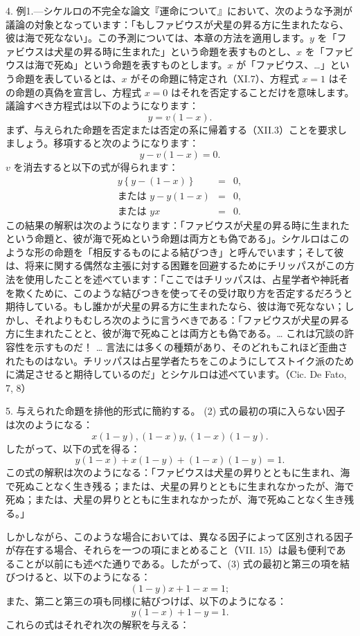 \documentclass[a4paper,11pt,openany]{ltjsbook}
\begin{document}
4. 例1.—シケルロの不完全な論文『運命について』において、次のような予測が議論の対象となっています：「もしファビウスが犬星の昇る方に生まれたなら、彼は海で死なない」。この予測については、本章の方法を適用します。$y$ を「ファビウスは犬星の昇る時に生まれた」という命題を表すものとし、$x$ を「ファビウスは海で死ぬ」という命題を表すものとします。$x$ が「ファビウス、…」という命題を表しているとは、$x$ がその命題に特定され（XI.7）、方程式 $x = 1$ はその命題の真偽を宣言し、方程式 $x = 0$ はそれを否定することだけを意味します。議論すべき方程式は以下のようになります：
\[
y = v(1-x).
\]
まず、与えられた命題を否定または否定の系に帰着する（XII.3）ことを要求しましょう。移項すると次のようになります：
\[
y - v(1-x) = 0.
\]
$v$ を消去すると以下の式が得られます：
\begin{eqnarray}
y \left\{ y - (1-x) \right\} &=& 0, \nonumber \\
\textrm{または } y - y(1-x) &=& 0, \nonumber \\
\textrm{または } yx &=& 0.
\end{eqnarray}
この結果の解釈は次のようになります：「ファビウスが犬星の昇る時に生まれたという命題と、彼が海で死ぬという命題は両方とも偽である」。シケルロはこのような形の命題を「相反するものによる結びつき」と呼んでいます；そして彼は、将来に関する偶然な主張に対する困難を回避するためにチリッパスがこの方法を使用したことを述べています：「ここではチリッパスは、占星学者や神託者を欺くために、このような結びつきを使ってその受け取り方を否定するだろうと期待している。もし誰かが犬星の昇る方に生まれたなら、彼は海で死なない；しかし、それよりもむしろ次のように言うべきである：「ファビウスが犬星の昇る方に生まれたことと、彼が海で死ぬことは両方とも偽である。… これは冗談の許容性を示すものだ！ … 言法には多くの種類があり、そのどれもこれほど歪曲されたものはない。チリッパスは占星学者たちをこのようにしてストイク派のために満足させると期待しているのだ」とシケルロは述べています。（Cic. De Fato, 7, 8）

5. 与えられた命題を排他的形式に簡約する。
(2) 式の最初の項に入らない因子は次のようになる：
\[
x(1-y), (1-x)y, (1-x)(1-y).
\]
したがって、以下の式を得る：
\begin{equation}
y(1-x) + x(1-y) + (1-x)(1-y) = 1.
\end{equation}
この式の解釈は次のようになる：「ファビウスは犬星の昇りとともに生まれ、海で死ぬことなく生き残る；または、犬星の昇りとともに生まれなかったが、海で死ぬ；または、犬星の昇りとともに生まれなかったが、海で死ぬことなく生き残る。」

しかしながら、このような場合においては、異なる因子によって区別される因子が存在する場合、それらを一つの項にまとめること（VII. 15）は最も便利であることが以前にも述べた通りである。したがって、(3) 式の最初と第三の項を結びつけると、以下のようになる：
\[
(1 - y)x + 1 - x = 1;
\]
また、第二と第三の項も同様に結びつけば、以下のようになる：
\[
y(1-x)+1-y=1.
\]
これらの式はそれぞれ次の解釈を与える：
\end{document}
